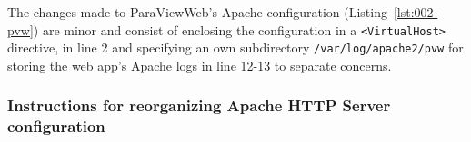 

The changes made to ParaViewWeb's Apache configuration
(Listing~\ref{lst:002-pvw}) are minor and consist of enclosing the configuration
in a \texttt{<VirtualHost>} directive,  in line 2 and specifying an own
subdirectory \texttt{/var/log/apache2/pvw} for storing the web app's Apache logs
in line 12-13 to separate concerns.



\subsubsection*{Instructions for reorganizing Apache HTTP Server configuration}

